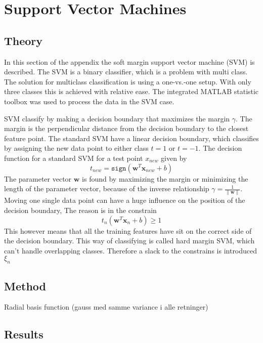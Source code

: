 \chapter{Support Vector Machines}
\section{Theory}

In this section of the appendix the soft margin support vector machine (SVM) is described. The SVM is a binary classifier, which is a problem with multi class. 
The solution for multiclass classification is using a one-vs.-one setup.
With only three classes this is achieved with relative ease. 
The integrated MATLAB statistic toolbox was used to process the data in the SVM case. 

SVM classify by making a decision boundary that maximizes the margin $ \gamma $.
The margin is the perpendicular distance from the decision boundary to the closest feature point.
The standard SVM have a linear decision boundary, which classifies by assigning the new data point to either class $ t=1 $ or $ t=-1 $. 
The decision function for a standard SVM for a test point $ x_{new} $ given by
\begin{equation}
t_{new} = \mathtt{sign}(\mathbf{w}^T \mathbf{x}_{new} +b)
\label{eq:SVM_lin}
\end{equation}
The parameter vector $ \mathbf{w} $ is found by maximizing the margin or minimizing the length of the parameter vector, because of the inverse relationship $ \gamma = \frac{1}{\|\mathbf{w}\|} $.
Moving one single data point can have a huge influence on the position of the decision boundary, The reason is in the constrain
\begin{equation}
t_n(\mathbf{w}^T \mathbf{x}_n + b) \geq 1
\end{equation}   
This however means that all the training features have sit on the correct side of the decision boundary.
This way of classifying is called hard margin SVM, which can't handle overlapping classes.
Therefore a slack to the constrains is introduced $ \xi_n $
 
 
\section{Method}
Radial basis function (gauss med samme variance i alle retninger) 
\section{Results}

